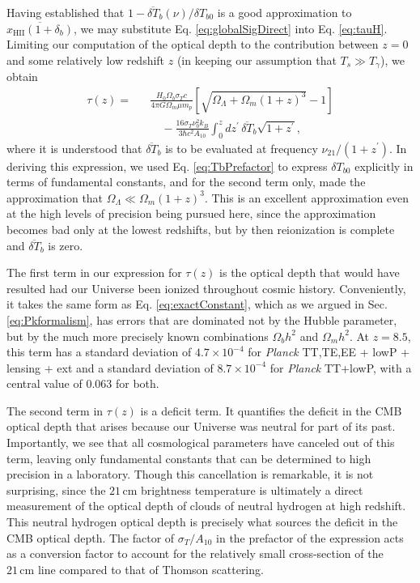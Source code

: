 \documentclass[twocolumn,aps,prd,nofootinbib,showpacs]{revtex4-1}
\begin{document}
Having established that $1- \overline{\delta T}_b (\nu)/\delta T_{b0}$ is a good approximation to $\overline{x_\textrm{HII} (1+\delta_b)}$, we may substitute Eq. \eqref{eq:globalSigDirect} into Eq. \eqref{eq:tauH}. Limiting our computation of the optical depth to the contribution between $z=0$ and some relatively low redshift $z$ (in keeping our assumption that $T_s \gg T_\gamma$), we obtain
\begin{eqnarray}
\tau(z) = &&\frac{H_0 \Omega_b \sigma_Tc}{4 \pi G \Omega_m \mu m_p} \left[ \sqrt{\Omega_\Lambda + \Omega_m (1+z)^3} -1 \right] \nonumber \\
&&\quad - \frac{16 \sigma_T \nu_0^2 k_B}{3 \hbar c^2 A_{10}} \int_0^z dz^\prime \, \overline{\delta T}_b \sqrt{1+z^\prime},
\end{eqnarray}
where it is understood that $\overline{\delta T}_b$ is to be evaluated at frequency $\nu_{21} / (1+z^\prime)$. In deriving this expression, we used Eq. \eqref{eq:TbPrefactor} to express $\delta T_{b0}$ explicitly in terms of fundamental constants, and for the second term only, made the approximation that $\Omega_\Lambda \ll \Omega_m (1+z)^3$. This is an excellent approximation even at the high levels of precision being pursued here, since the approximation becomes bad only at the lowest redshifts, but by then reionization is complete and $\overline{\delta T}_b$ is zero.

The first term in our expression for $\tau(z)$ is the optical depth that would have resulted had our Universe been ionized throughout cosmic history. Conveniently, it takes the same form as Eq. \eqref{eq:exactConstant}, which as we argued in Sec. \ref{eq:Pkformalism}, has errors that are dominated not by the Hubble parameter, but by the much more precisely known combinations $\Omega_b h^2$ and $\Omega_m h^2$. At $z=8.5$, this term has a standard deviation of $4.7\times 10^{-4}$ for \emph{Planck} TT,TE,EE + lowP + lensing + ext and a standard deviation of $8.7 \times 10^{-4}$ for \emph{Planck} TT+lowP, with a central value of $0.063$ for both.

The second term in $\tau(z)$ is a deficit term. It quantifies the deficit in the CMB optical depth that arises because our Universe was neutral for part of its past. Importantly, we see that all cosmological parameters have canceled out of this term, leaving only fundamental constants that can be determined to high precision in a laboratory. Though this cancellation is remarkable, it is not surprising, since the $21\,\textrm{cm}$ brightness temperature is ultimately a direct measurement of the optical depth of clouds of neutral hydrogen at high redshift. This neutral hydrogen optical depth is precisely what sources the deficit in the CMB optical depth. The factor of $\sigma_T  / A_{10} $ in the prefactor of the expression acts as a conversion factor to account for the relatively small cross-section of the $21\,\textrm{cm}$ line compared to that of Thomson scattering.
\end{document}
